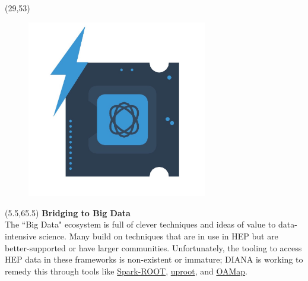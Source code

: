 \documentclass[final]{beamer}
\begin{document}
\begin{frame}{}
\begin{textblock}{12.5}(29,53)
\begin{figure}[tbph]
\centering
\includegraphics[width=0.7\textwidth]{images/faster-processing.jpg}
\end{figure}
\end{textblock}


\begin{textblock}{22.5}(5.5,65.5)
\textcolor{mybluelabel}{\bf Bridging to Big Data} \\
The ``Big Data" ecosystem is full of clever techniques and ideas of value to data-intensive science.
Many build on techniques that are in use in HEP but are better-supported or have larger communities.
Unfortunately, the tooling to access HEP data in these frameworks is non-existent or immature;
DIANA is working to remedy this through tools like \href{https://github.com/diana-hep/spark-root}{Spark-ROOT}, \href{https://github.com/scikit-hep/uproot}{uproot}, and \href{https://github.com/diana-hep/oamap}{OAMap}.
\end{textblock}


\end{frame}
\end{document}
